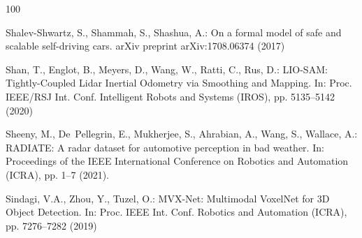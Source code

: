 \documentclass[graybox,envcountchap]{style/SNmono}
\begin{document}
\begin{thebibliography}{100}
{\par}
{\color{red} 
Shalev-Shwartz, S., Shammah, S., Shashua, A.: On a formal model of safe and
  scalable self-driving cars.
\newblock arXiv preprint arXiv:1708.06374  (2017)

\par}
{\color{red} 
Shan, T., Englot, B., Meyers, D., Wang, W., Ratti, C., Rus, D.: {LIO-SAM:
  Tightly-Coupled Lidar Inertial Odometry via Smoothing and Mapping}.
\newblock In: Proc. IEEE/RSJ Int. Conf. Intelligent Robots and Systems (IROS),
  pp. 5135--5142 (2020)

\par}

Sheeny, M., De~Pellegrin, E., Mukherjee, S., Ahrabian, A., Wang, S., Wallace,
  A.: {RADIATE}: A radar dataset for automotive perception in bad weather.
\newblock In: Proceedings of the IEEE International Conference on Robotics and
  Automation (ICRA), pp. 1--7 (2021).
\newblock {}


{\color{red} 
Sindagi, V.A., Zhou, Y., Tuzel, O.: {MVX-Net: Multimodal VoxelNet for 3D Object
  Detection}.
\newblock In: Proc. IEEE Int. Conf. Robotics and Automation (ICRA), pp.
  7276--7282 (2019)

\par}


\end{thebibliography}
\end{document}
